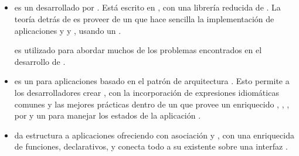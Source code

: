 \subsection{\clientSideAS}
	\begin{itemize}
		\item 
			\textbf{\angularjsNAME} es un \frameworkPC \clientSideAS desarrollado por \googleNAME. Está escrito en \javaScriptNAME, con una librería reducida de \jqueryNAME. La teoría detrás de \angularjsNAME es proveer de un \frameworkPC que hace sencilla la implementación de aplicaciones y \webPageINT \wellDesignQA y \structuredQA, usando un \frameworkPC \mvcAS \cite{book_technology_node_mongo_angular_development}. 

			\angularjsNAME es utilizado para abordar muchos de los problemas encontrados en el desarrollo de \singlePageAppINT \cite{technology_angularjs}.

		\item 
			\textbf{\emberjsNAME} \cite{online_technology_emberjs} es un \frameworkPC \openSourcePC \clientSideAS \javaScriptNAME para aplicaciones \webINT basado en el patrón de arquitectura \mvcAS. Esto permite a los desarrolladores crear \singlePageAppINT \scalablesQA \cite{online_Enterprise_Moving_SinglePage_Design}, con la incorporación de expresiones idiomáticas comunes y las mejores prácticas dentro de un  \frameworkPC que provee un enriquecido \objectModelPL, \dataBindingPL \declarativePL \twoWayINT, \computedPropEmberAS, \templatesAS \autoUpdatedAS \poweredCPT por \handlebarsNAME y un \routerPC para manejar los estados de la aplicación \cite{online_technology_emberjs_getting_into}.

		\item
			\textbf{\backbonejsNAME} da estructura a aplicaciones \webINT ofreciendo \textbf{\modelsCustom} con asociación \keyValue y \events \custom, \textbf{\collectionsDB} con una \apiAS enriquecida de funciones, \textbf{\viewsAS} \handling \event declarativos, y conecta todo a su \apiAS existente sobre una interfaz \jsonNAME \restful \cite{online_technology_backbone}.
		


\end{itemize}
